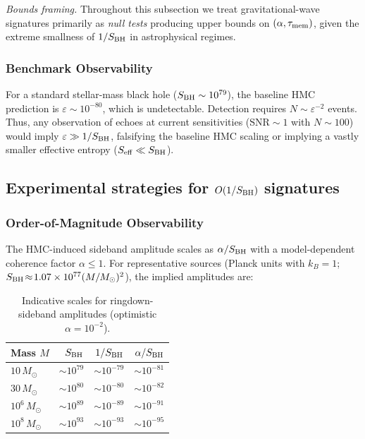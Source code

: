 \documentclass[11pt,a4paper]{article}
\providecommand{\texorpdfstring}[2]{#1}
\newcommand{\HMC}{\textsc{HMC}\xspace}
\theoremstyle{plain}
\theoremstyle{definition}
\theoremstyle{remark}
\begin{document}
\emph{Bounds framing.} Throughout this subsection we treat gravitational-wave signatures primarily as \emph{null tests} producing upper bounds on $(\alpha,\tau_{\rm mem})$, given the extreme smallness of $1/S_{\rm BH}$ in astrophysical regimes.

\subsubsection{Benchmark Observability}
For a standard stellar-mass black hole ($S_{\rm BH} \sim 10^{79}$), the baseline HMC prediction is $\varepsilon \sim 10^{-80}$, which is undetectable.
Detection requires $N \sim \varepsilon^{-2}$ events.
Thus, any observation of echoes at current sensitivities ($\text{SNR} \sim 1$ with $N \sim 100$) would imply $\varepsilon \gg 1/S_{\rm BH}$, falsifying the baseline HMC scaling or implying a vastly smaller effective entropy ($S_{\rm eff} \ll S_{\rm BH}$).

\subsection{Experimental strategies for \texorpdfstring{$O(1/S_{\rm BH})$}{O(1/SBH)} signatures}

\label{sec:exp}

\subsubsection{Order-of-Magnitude Observability}
The \HMC{}-induced sideband amplitude scales as $\alpha/S_{\rm BH}$ with a model-dependent coherence factor $\alpha\!\le\!1$.
For representative sources (Planck units with $k_B{=}1$; $S_{\rm BH}\!\approx\!1.07\times 10^{77}(M/M_\odot)^2$), the implied amplitudes are:

\begin{table}[htbp]
\centering
\caption{Indicative scales for ringdown-sideband amplitudes (optimistic $\alpha=10^{-2}$).}
\label{tab:observability}
\small
\begin{tabular}{lrrr}
\toprule
Mass $M$ & $S_{\rm BH}$ & $1/S_{\rm BH}$ & $\alpha/S_{\rm BH}$ \\
\midrule
$10\,M_\odot$ & $\sim 10^{79}$ & $\sim 10^{-79}$ & $\sim 10^{-81}$ \\
$30\,M_\odot$ & $\sim 10^{80}$ & $\sim 10^{-80}$ & $\sim 10^{-82}$ \\
$10^6\,M_\odot$ & $\sim 10^{89}$ & $\sim 10^{-89}$ & $\sim 10^{-91}$ \\
$10^8\,M_\odot$ & $\sim 10^{93}$ & $\sim 10^{-93}$ & $\sim 10^{-95}$ \\
\bottomrule
\end{tabular}
\end{table}
\end{document}
